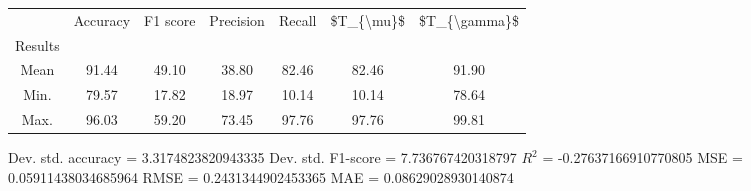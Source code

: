 \begin{tabular}{|c|c|c|c|c|c|c|}
\toprule
{} &  Accuracy &  F1 score &  Precision &  Recall &  \$T\_\{\textbackslash mu\}\$ &  \$T\_\{\textbackslash gamma\}\$ \\
Results &           &           &            &         &            &               \\
\hline
Mean    &     91.44 &     49.10 &      38.80 &   82.46 &      82.46 &         91.90 \\
Min.    &     79.57 &     17.82 &      18.97 &   10.14 &      10.14 &         78.64 \\
Max.    &     96.03 &     59.20 &      73.45 &   97.76 &      97.76 &         99.81 \\
\bottomrule
\end{tabular}

 Dev. std. accuracy = 3.3174823820943335
 Dev. std. F1-score = 7.736767420318797
 $R^2$ = -0.27637166910770805
 MSE = 0.05911438034685964
 RMSE = 0.2431344902453365
 MAE = 0.08629028930140874